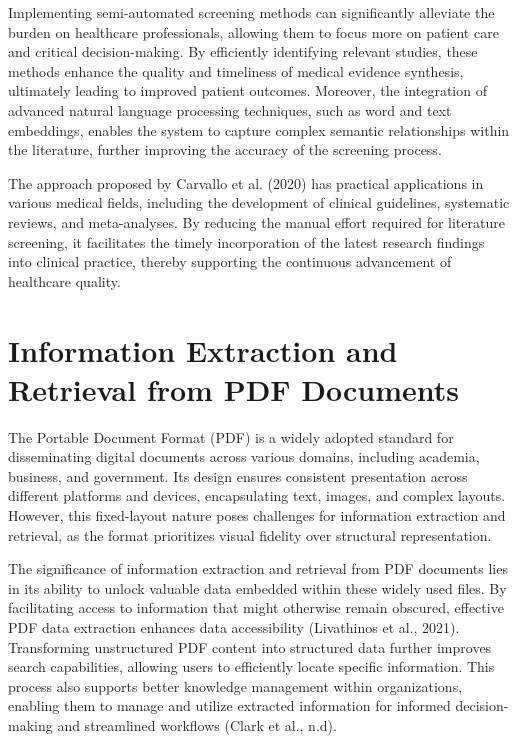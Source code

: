 Implementing semi-automated screening methods can significantly alleviate the burden on healthcare professionals, allowing them to focus more on patient care and critical decision-making. By efficiently identifying relevant studies, these methods enhance the quality and timeliness of medical evidence synthesis, ultimately leading to improved patient outcomes. Moreover, the integration of advanced natural language processing techniques, such as word and text embeddings, enables the system to capture complex semantic relationships within the literature, further improving the accuracy of the screening process.

The approach proposed by Carvallo et al. (2020) has practical applications in various medical fields, including the development of clinical guidelines, systematic reviews, and meta-analyses. By reducing the manual effort required for literature screening, it facilitates the timely incorporation of the latest research findings into clinical practice, thereby supporting the continuous advancement of healthcare quality.



\section{Information Extraction and Retrieval from PDF Documents}

\noindent The Portable Document Format (PDF) is a widely adopted standard for disseminating digital documents across various domains, including academia, business, and government. Its design ensures consistent presentation across different platforms and devices, encapsulating text, images, and complex layouts. However, this fixed-layout nature poses challenges for information extraction and retrieval, as the format prioritizes visual fidelity over structural representation.

The significance of information extraction and retrieval from PDF documents lies in its ability to unlock valuable data embedded within these widely used files. By facilitating access to information that might otherwise remain obscured, effective PDF data extraction enhances data accessibility (Livathinos et al., 2021). Transforming unstructured PDF content into structured data further improves search capabilities, allowing users to efficiently locate specific information. This process also supports better knowledge management within organizations, enabling them to manage and utilize extracted information for informed decision-making and streamlined workflows (Clark et al., n.d).


